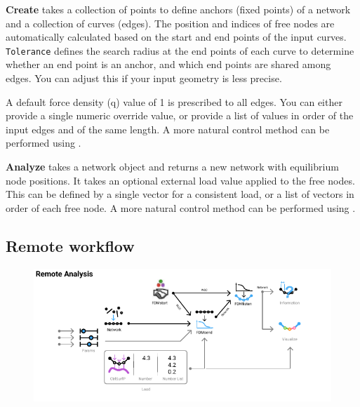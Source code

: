 \textbf{Create} takes a collection of points to define anchors (fixed points) of a network and a collection of curves (edges). The position and indices of free nodes are automatically calculated based on the start and end points of the input curves. \texttt{Tolerance} defines the search radius at the end points of each curve to determine whether an end point is an anchor, and which end points are shared among edges. You can adjust this if your input geometry is less precise.

A default force density (q) value of 1 is prescribed to all edges. You can either provide a single numeric override value, or provide a list of values in order of the input edges and of the same length. A more natural control method can be performed using .

\textbf{Analyze} takes a network object and returns a new network with equilibrium node positions. It takes an optional external load value applied to the free nodes. This can be defined by a single vector for a consistent load, or a list of vectors in order of each free node. A more natural control method can be performed using .

\subsection*{Remote workflow}

\begin{figure}[h]
    \centering
    \includegraphics*[width = \textwidth]{Figures/remote}
\end{figure}

